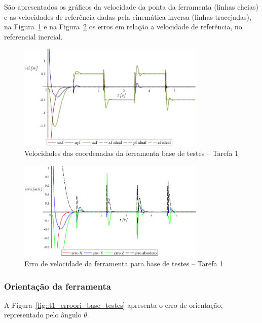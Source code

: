São apresentados os gráficos da velocidade da ponta da ferramenta (linhas
cheias) e as velocidades de referência dadas pela cinemática inversa (linhas
tracejadas), na Figura~\ref{fig::t1_velf_base_testes} e na
Figura~\ref{fig::t1_errovelf_base_testes} os erros em relação a velocidade de
referência, no referencial inercial.

\begin{figure}[h!]
	\centering 
 	\includegraphics[width=0.80\textwidth]{figs/t1_velf_base_testes}
 	\caption{Velocidades das coordenadas da ferramenta base de testes --
 	Tarefa 1}
 	\label{fig::t1_velf_base_testes}
\end{figure}

\begin{figure}[h!]
	\centering 
 	\includegraphics[width=0.80\textwidth]{figs/t1_errovelf_base_testes}
 	\caption{Erro de velocidade da ferramenta para base de testes --
 	Tarefa 1}
 	\label{fig::t1_errovelf_base_testes}
\end{figure}


\subsubsection{Orientação da ferramenta}

A Figura~\ref{fig::t1_erroori_base_testes} apresenta o erro de orientação,
representado pelo ângulo $\theta$.

